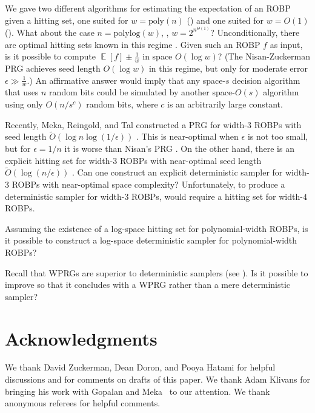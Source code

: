 \documentclass{toc}
\DeclareMathOperator*{\ExpVal}{\mathbb{E}}
\begin{document}
We gave two different algorithms for estimating the expectation of an ROBP given a hitting set, one suited for $w = \text{poly}(n)$ () and one suited for $w = O(1)$ (). What about the case $n = \text{polylog}(w)$, \ie, $w = 2^{n^{\Theta(1)}}$? Unconditionally, there are optimal hitting sets known in this regime \cite{AKS87, HZ20}. Given such an ROBP $f$ as input, is it possible to compute $\ExpVal[f] \pm \frac{1}{w}$ in space $O(\log w)$? (The Nisan-Zuckerman PRG \cite{NZ96} achieves seed length $O(\log w)$ in this regime, but only for moderate error $\epsilon \gg \frac{1}{w}$.) An affirmative answer would imply that any space-$s$ decision algorithm that uses $n$ random bits could be simulated by another space-$O(s)$ algorithm using only $O(n / s^c)$ random bits, where $c$ is an arbitrarily large constant.

Recently, Meka, Reingold, and Tal constructed a PRG for width-$3$ ROBPs with seed length \linebreak $\widetilde{O}(\log n \log(1/\epsilon))$ \cite{MRT19}. This is near-optimal when $\epsilon$ is not too small, but for $\epsilon = 1/n$ it is worse than Nisan's PRG \cite{Nis92}. On the other hand, there is an explicit hitting set for width-$3$ ROBPs with near-optimal seed length $\widetilde{O}(\log(n/\epsilon))$ \cite{GMRTV12}. Can one construct an explicit deterministic sampler for width-$3$ ROBPs with near-optimal space complexity? Unfortunately, to produce a deterministic sampler for width-$3$ ROBPs,  would require a hitting set for width-$4$ ROBPs.

Assuming the existence of a log-space hitting set for polynomial-width ROBPs, is it possible to construct a log-space deterministic sampler for polynomial-width ROBPs?

Recall that WPRGs are superior to deterministic samplers (see ). Is it possible to improve  so that it concludes with a WPRG rather than a mere deterministic sampler?

\section{Acknowledgments}

We thank David Zuckerman, Dean Doron, and Pooya Hatami for helpful discussions and for comments on drafts of this paper. We thank Adam Klivans for bringing his work with Gopalan and Meka~\cite{GKM12} to our attention. We thank anonymous referees for helpful comments.
\end{document}
